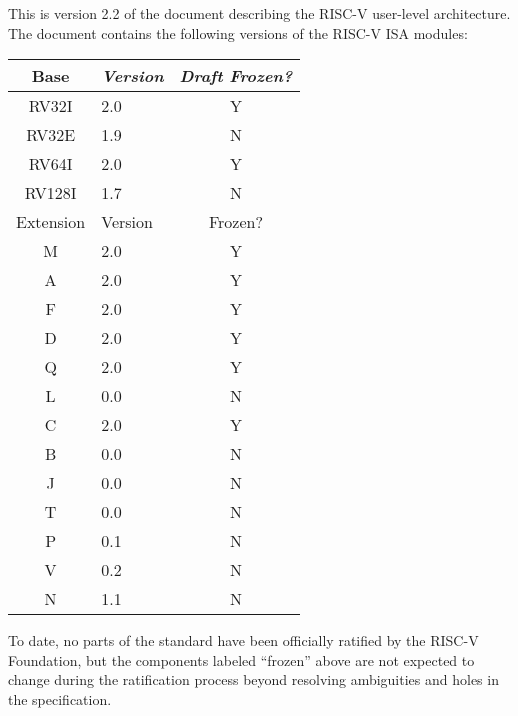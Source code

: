 This is version 2.2 of the document describing the RISC-V
user-level architecture.  The document contains the following
versions of the RISC-V ISA modules:
\begin{table}[hbt]
  \centering
  \begin{tabular}{|c|l|c|}
    \hline
    Base     & \em Version & \em Draft Frozen? \\
    \hline
    RV32I    & 2.0 & Y \\
    RV32E    & 1.9 & N \\
    RV64I    & 2.0 & Y \\
    RV128I   & 1.7 & N \\
    \hline
    Extension & Version & Frozen? \\
    \hline
    M        & 2.0 & Y \\
    A        & 2.0 & Y \\
    F        & 2.0 & Y \\
    D        & 2.0 & Y \\
    Q        & 2.0 & Y \\
    L        & 0.0 & N \\
    C        & 2.0 & Y \\
    B        & 0.0 & N \\
    J        & 0.0 & N \\
    T        & 0.0 & N \\
    P        & 0.1 & N \\
    V        & 0.2 & N \\
    N        & 1.1 & N \\
    \hline
  \end{tabular}
\end{table}

To date, no parts of the standard have been officially ratified by the
RISC-V Foundation, but the components labeled ``frozen'' above are not
expected to change during the ratification process beyond resolving
ambiguities and holes in the specification.

